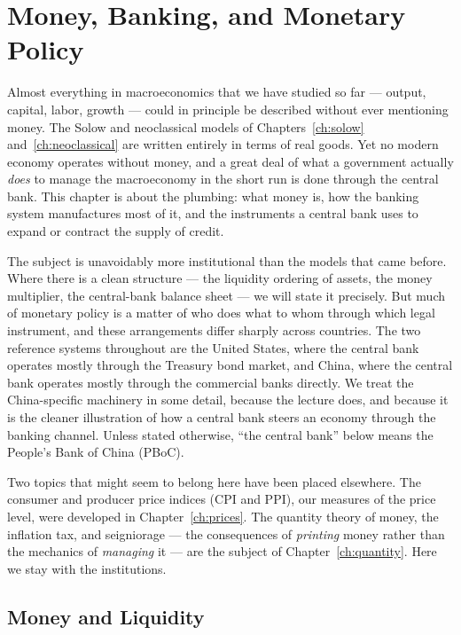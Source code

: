 \chapter{Money, Banking, and Monetary Policy}
\label{ch:money}

Almost everything in macroeconomics that we have studied so far --- output, capital, labor, growth --- could in principle be described without ever mentioning money. The Solow and neoclassical models of Chapters~\ref{ch:solow} and~\ref{ch:neoclassical} are written entirely in terms of real goods. Yet no modern economy operates without money, and a great deal of what a government actually \emph{does} to manage the macroeconomy in the short run is done through the central bank. This chapter is about the plumbing: what money is, how the banking system manufactures most of it, and the instruments a central bank uses to expand or contract the supply of credit.

The subject is unavoidably more institutional than the models that came before. Where there is a clean structure --- the liquidity ordering of assets, the money multiplier, the central-bank balance sheet --- we will state it precisely. But much of monetary policy is a matter of who does what to whom through which legal instrument, and these arrangements differ sharply across countries. The two reference systems throughout are the United States, where the central bank operates mostly through the Treasury bond market, and China, where the central bank operates mostly through the commercial banks directly. We treat the China-specific machinery in some detail, because the lecture does, and because it is the cleaner illustration of how a central bank steers an economy through the banking channel. Unless stated otherwise, ``the central bank'' below means the People's Bank of China (PBoC).

Two topics that might seem to belong here have been placed elsewhere. The consumer and producer price indices (CPI and PPI), our measures of the price level, were developed in Chapter~\ref{ch:prices}. The quantity theory of money, the inflation tax, and seigniorage --- the consequences of \emph{printing} money rather than the mechanics of \emph{managing} it --- are the subject of Chapter~\ref{ch:quantity}. Here we stay with the institutions.

\section{Money and Liquidity}

